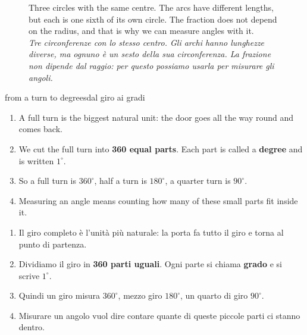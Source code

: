 \documentclass[10pt,a4paper,oneside]{book}
\newcommand{\bicap}[2]{\caption{#1\\{\color{itgreen}\itshape #2}}}
\begin{document}
\begin{figure}[htbp]
\centering
\bicap{Three circles with the same centre. The arcs have different lengths, but each is one sixth of its own circle. The fraction does not depend on the radius, and that is why we can measure angles with it.}%
      {Tre circonferenze con lo stesso centro. Gli archi hanno lunghezze diverse, ma ognuno è un sesto della sua circonferenza. La frazione non dipende dal raggio: per questo possiamo usarla per misurare gli angoli.}
\label{fig:concentric}
\end{figure}

\begin{rebuild}{from a turn to degrees}{dal giro ai gradi}
\begin{enumerate}[label=\arabic*.]
\item A full turn is the biggest natural unit: the door goes all the way round and comes back.
\item We cut the full turn into \textbf{360 equal parts}. Each part is called a \textbf{degree} and is written $1^\circ$.
\item So a full turn is $360^\circ$, half a turn is $180^\circ$, a quarter turn is $90^\circ$.
\item Measuring an angle means counting how many of these small parts fit inside it.
\end{enumerate}
\tcblower
\begin{enumerate}[label=\arabic*.]
\item Il giro completo è l'unità più naturale: la porta fa tutto il giro e torna al punto di partenza.
\item Dividiamo il giro in \textbf{360 parti uguali}. Ogni parte si chiama \textbf{grado} e si scrive $1^\circ$.
\item Quindi un giro misura $360^\circ$, mezzo giro $180^\circ$, un quarto di giro $90^\circ$.
\item Misurare un angolo vuol dire contare quante di queste piccole parti ci stanno dentro.
\end{enumerate}
\end{rebuild}
\end{document}
